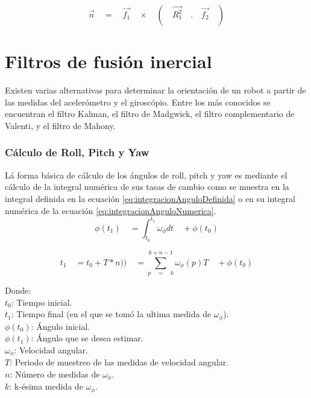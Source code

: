 \begin{equation}
\overset { \rightarrow  }{ n } \quad =\quad \overset { \rightarrow  }{ { f }_{ 1 } } \quad \times \quad (\quad \overset { \rightarrow  }{ { { R }_{ 1 }^{ 2 } } } \quad .\quad \overset { \rightarrow  }{ { f }_{ 2 } } \quad )
\label{eq:normalEpipolar}
\end{equation}


\section{ Filtros de fusión inercial }

Existen varias alternativas para determinar la orientación de un robot a partir de las medidas del acelerómetro y el giroscópio. Entre los más conocidos se encuentran el filtro Kalman, el filtro de Madgwick, el filtro complementario de Valenti, y el filtro de Mahony.

\subsubsection{Cálculo de Roll, Pitch y Yaw}
Lá forma básica de cálculo de los ángulos de roll, pitch y yaw es mediante el cálculo de la integral numérica de sus tasas de cambio como se muestra en
la integral definida en la ecuación 
\ref{eq:integracionAnguloDefinida} o en su integral numérica de la ecuación \ref{eq:integracionAnguloNumerica}.\\

\begin{equation} \label{eq:integracionAnguloDefinida}
\phi ({ t }_{ 1 })\quad =\int _{ { t }_{ 0 } }^{ { t }_{ 1 } }{ { \omega  }_{ \phi  }dt } \quad +\phi ({ t }_{ 0 })
\end{equation}

\begin{equation} \label{eq:integracionAnguloNumerica}
{ t }_{ 1 }\quad ={ { t }_{ 0 }+T*n) })\quad =\sum _{ p\quad =\quad k }^{ k+n-1 }{ \omega _{ \phi  }(p)T } \quad +\phi ({ t }_{ 0 })
\end{equation}

Donde:\\
$t_0 $: Tiempo inicial.\\
$t_1 $: Tiempo final (en el que se tomó la ultima medida de $\omega _{ \phi  }$).\\
$\phi ({ t }_{ 0 })$: Ángulo inicial.\\
$\phi ({ t }_{ 1 })$: Ángulo que se desea estimar.\\
$\omega _{ \phi  }$: Velocidad angular.\\
$T$: Periodo de muestreo de las medidas de velocidad angular.\\
$n$: Número de medidas de $\omega _{ \phi  }$.\\
$k$: k-ésima medida de $\omega _{ \phi  }$. \\


